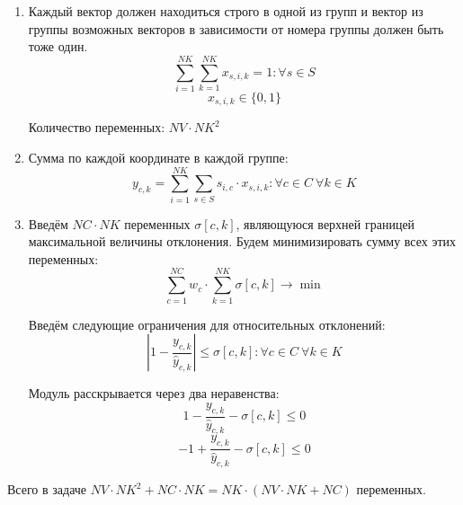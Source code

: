 \documentclass[%
10pt, %
final, %
oneside, %
onecolumn, %
centertags]{article} %
\theoremstyle{plain}
\theoremstyle{definition}
\theoremstyle{remark}
\begin{document}
\begin{enumerate}
	\item Каждый вектор должен находиться строго в одной из групп и вектор из группы возможных векторов в зависимости от номера группы должен быть тоже один.
	$$\sum\limits_{i=1}^{NK} \sum\limits_{k=1}^{NK}x_{s,i,k} = 1 : \forall s \in S $$
	$$x_{s,i,k} \in \{0,1\}$$

	Количество переменных: $NV\cdot NK^2$
	\item Сумма по каждой координате в каждой группе:
	$$y_{c,k} = \sum\limits_{i=1}^{NK} \sum\limits_{s\in S} s_{i,c} \cdot x_{s,i,k}:  \forall c \in C \  \forall k \in K $$
	\item Введём $NC\cdot NK$ переменных $\sigma[c,k]$, являющуюся верхней границей максимальной величины отклонения. Будем минимизировать сумму всех этих переменных:
	$$\sum\limits_{c=1}^{NC} w_c \cdot \sum\limits_{k=1}^{NK} \sigma[c,k] \to \min$$

	Введём следующие ограничения для относительных отклонений:
	$$\left\vert 1 - \frac{y_{c,k}}{\hat{y}_{c,k}}\right\vert \leq \sigma[c,k] : \forall c \in C \ \forall k \in K$$

	Модуль расскрывается через два неравенства:
	$$1 - \frac{y_{c,k}}{\hat{y}_{c,k}} - \sigma[c,k] \leq 0$$
	$$-1 + \frac{y_{c,k}}{\hat{y}_{c,k}} - \sigma[c,k] \leq 0$$ 
\end{enumerate}

Всего в задаче $NV\cdot NK^2 + NC \cdot NK = NK\cdot(NV \cdot NK + NC)$ переменных.
\end{document}
